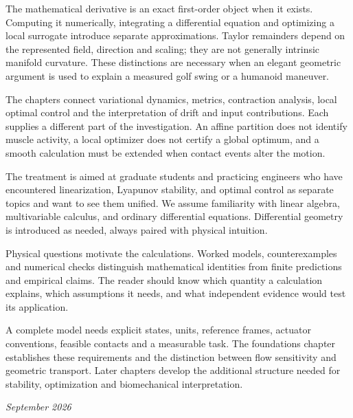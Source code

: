 \documentclass[10pt,letterpaper,openany]{book}
\theoremstyle{plain}
\theoremstyle{definition}
\theoremstyle{remark}
\begin{document}
The mathematical derivative is an exact first-order object when it exists. Computing it numerically, integrating a differential equation and optimizing a local surrogate introduce separate approximations. Taylor remainders depend on the represented field, direction and scaling; they are not generally intrinsic manifold curvature. These distinctions are necessary when an elegant geometric argument is used to explain a measured golf swing or a humanoid maneuver.

The chapters connect variational dynamics, metrics, contraction analysis, local optimal control and the interpretation of drift and input contributions. Each supplies a different part of the investigation. An affine partition does not identify muscle activity, a local optimizer does not certify a global optimum, and a smooth calculation must be extended when contact events alter the motion.

The treatment is aimed at graduate students and practicing engineers who have encountered linearization, Lyapunov stability, and optimal control as separate topics and want to see them unified. We assume familiarity with linear algebra, multivariable calculus, and ordinary differential equations. Differential geometry is introduced as needed, always paired with physical intuition.

Physical questions motivate the calculations. Worked models, counterexamples and numerical checks distinguish mathematical identities from finite predictions and empirical claims. The reader should know which quantity a calculation explains, which assumptions it needs, and what independent evidence would test its application.

A complete model needs explicit states, units, reference frames, actuator conventions, feasible contacts and a measurable task. The foundations chapter establishes these requirements and the distinction between flow sensitivity and geometric transport. Later chapters develop the additional structure needed for stability, optimization and biomechanical interpretation.

\vspace{1cm}
\hfill\textit{September 2026}

\tableofcontents


\mainmatter











\end{document}

